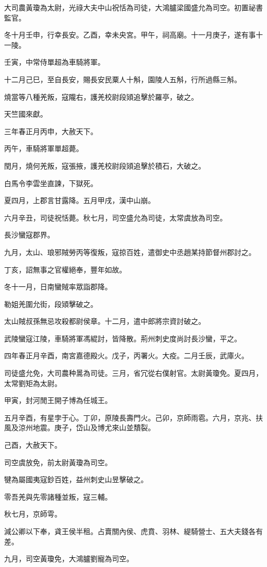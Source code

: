\begin{pinyinscope}
大司農黃瓊為太尉，光祿大夫中山祝恬為司徒，大鴻臚梁國盛允為司空。初置祕書監官。

冬十月壬申，行幸長安。乙酉，幸未央宮。甲午，祠高廟。十一月庚子，遂有事十一陵。

壬寅，中常侍單超為車騎將軍。

十二月己巳，至自長安，賜長安民粟人十斛，園陵人五斛，行所過縣三斛。

燒當等八種羌叛，寇隴右，護羌校尉段熲追擊於羅亭，破之。

天竺國來獻。

三年春正月丙申，大赦天下。

丙午，車騎將軍單超薨。

閏月，燒何羌叛，寇張掖，護羌校尉段熲追擊於積石，大破之。

白馬令李雲坐直諫，下獄死。

夏四月，上郡言甘露降。五月甲戌，漢中山崩。

六月辛丑，司徒祝恬薨。秋七月，司空盛允為司徒，太常虞放為司空。

長沙蠻寇郡界。

九月，太山、琅邪賊勞丙等復叛，寇掠百姓，遣御史中丞趙某持節督州郡討之。

丁亥，詔無事之官權絕奉，豐年如故。

冬十一月，日南蠻賊率眾詣郡降。

勒姐羌圍允街，段熲擊破之。

太山賊叔孫無忌攻殺都尉侯章。十二月，遣中郎將宗資討破之。

武陵蠻寇江陵，車騎將軍馮緄討，皆降散。荊州刺史度尚討長沙蠻，平之。

四年春正月辛酉，南宮嘉德殿火。戊子，丙署火。大疫。二月壬辰，武庫火。

司徒盛允免，大司農种暠為司徒。三月，省冗從右僕射官。太尉黃瓊免。夏四月，太常劉矩為太尉。

甲寅，封河閒王開子博為任城王。

五月辛酉，有星孛于心。丁卯，原陵長壽門火。己卯，京師雨雹。六月，京兆、扶風及涼州地震。庚子，岱山及博尤來山並穨裂。

己酉，大赦天下。

司空虞放免，前太尉黃瓊為司空。

犍為屬國夷寇鈔百姓，益州刺史山昱擊破之。

零吾羌與先零諸種並叛，寇三輔。

秋七月，京師雩。

減公卿以下奉，貣王侯半租。占賣關內侯、虎賁、羽林、緹騎營士、五大夫錢各有差。

九月，司空黃瓊免，大鴻臚劉寵為司空。


\end{pinyinscope}
